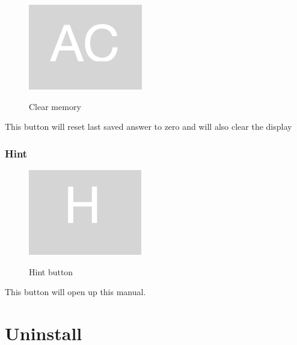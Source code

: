 \documentclass[11pt, a4paper]{article}
\begin{document}
    \begin{figure}[hbt!]
        \caption{Clear memory}
        \includegraphics[scale = 0.2]{clear_memory}
        \centering
        \label{fig:c}
    \end{figure}
    This button will reset last saved answer to zero and will also clear the display

    \subsubsection{Hint}
    \label{subsubsec:hint}


    \begin{figure}[hbt!]
        \caption{Hint button}
        \includegraphics[scale = 0.2]{hint}
        \centering
        \label{fig:h}
    \end{figure}

    This button will open up this manual.

    \newpage


    \section{Uninstall}
    \label{sec:uninstall}
\end{document}
